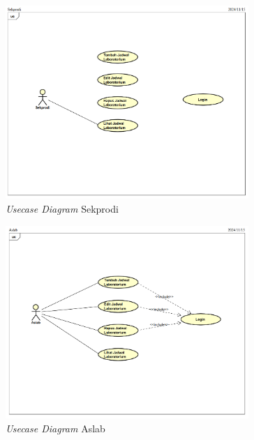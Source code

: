 \begin{figure}
	\centering
	\includegraphics[width=0.82\textwidth]{konten/gambar/usecase-diagram/sekprodi.png}
	\caption{\textit{Usecase Diagram} Sekprodi}
	\label{usecase-diagram-sekprodi}
\end{figure}

\begin{figure}
	\centering
	\includegraphics[width=0.82\textwidth]{konten/gambar/usecase-diagram/aslab.png}
	\caption{\textit{Usecase Diagram} Aslab}
	\label{usecase-diagram-aslab}
\end{figure}

